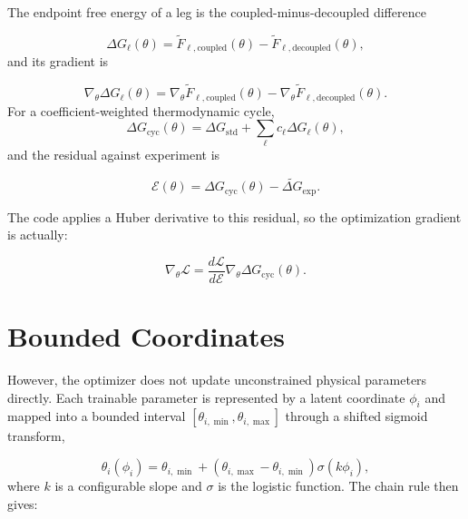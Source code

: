The endpoint free energy of a leg is the coupled-minus-decoupled difference

\begin{equation}
    \Delta G_\ell(\theta)
    =
    \widetilde{F}_{\ell,\mathrm{coupled}}(\theta)
    -
    \widetilde{F}_{\ell,\mathrm{decoupled}}(\theta),
    \label{eq:legdg}
\end{equation}
%
and its gradient is

\begin{equation}
    \nabla_\theta \Delta G_\ell(\theta)
    =
    \nabla_\theta \widetilde{F}_{\ell,\mathrm{coupled}}(\theta)
    -
    \nabla_\theta \widetilde{F}_{\ell,\mathrm{decoupled}}(\theta).
    \label{eq:legdggrad}
\end{equation}
For a coefficient-weighted thermodynamic cycle,
\begin{equation}
    \Delta G_{\mathrm{cyc}}(\theta)
    =
    \Delta G_{\mathrm{std}}
    +
    \sum_\ell c_\ell \Delta G_\ell(\theta),
    \label{eq:cycle}
\end{equation}
%
and the residual against experiment is

\begin{equation}
    \mathcal{E}(\theta)
    =
    \Delta G_{\mathrm{cyc}}(\theta)
    -
    \widetilde{\Delta G}_{\mathrm{exp}}.
    \label{eq:residual}
\end{equation}

The code applies a Huber derivative to this residual, so the optimization gradient is actually:

\begin{equation}
    \nabla_\theta \mathcal{L}
    =
    \frac{d \mathcal{L}}{d \mathcal{E}}
    \nabla_\theta \Delta G_{\mathrm{cyc}}(\theta).
    \label{eq:lossgradtheta}
\end{equation}

\section{Bounded Coordinates}

However, the optimizer does not update unconstrained physical parameters directly. Each trainable parameter is represented by a latent coordinate $\phi_i$ and mapped into a bounded interval $[\theta_{i,\min}, \theta_{i,\max}]$ through a shifted sigmoid transform,

\begin{equation}
    \theta_i(\phi_i)
    =
    \theta_{i,\min}
    +
    \left(
        \theta_{i,\max} - \theta_{i,\min}
    \right)
    \sigma(k \phi_i),
    \label{eq:phitheta}
\end{equation}
%
where $k$ is a configurable slope and $\sigma$ is the logistic function. The chain rule then gives:

